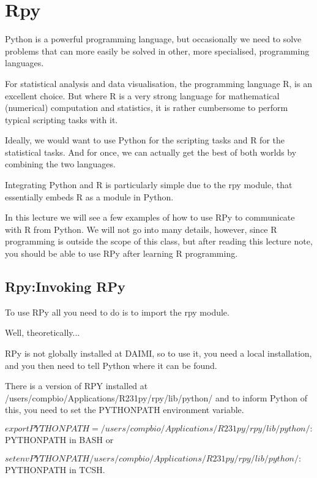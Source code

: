 \section{Rpy}

Python is a powerful programming language, but occasionally we need to solve problems that can more easily be solved in other, more specialised, programming languages.

For statistical analysis and data visualisation, the programming language R, is an excellent choice. But where R is a very strong language for mathematical (numerical) computation and statistics, it is rather cumbersome to perform typical scripting tasks with it.

Ideally, we would want to use Python for the scripting tasks and R for the statistical tasks. And for once, we can actually get the best of both worlds by combining the two languages.

Integrating Python and R is particularly simple due to the rpy module, that essentially embeds R as a module in Python.

In this lecture we will see a few examples of how to use RPy to communicate with R from Python. We will not go into many details, however, since R programming is outside the scope of this class, but after reading this lecture note, you should be able to use RPy after learning R programming.


\subsection{Rpy:Invoking RPy}

To use RPy all you need to do is to import the rpy module.

Well, theoretically...

RPy is not globally installed at DAIMI, so to use it, you need a local installation, and you then need to tell Python where it can be found.

There is a version of RPY installed at /users/compbio/Applications/R231py/rpy/lib/python/ and to inform Python of this, you need to set the PYTHONPATH environment variable.

$ export PYTHONPATH=/users/compbio/Applications/R231py/rpy/lib/python/:$PYTHONPATH
in BASH or

$ setenv PYTHONPATH /users/compbio/Applications/R231py/rpy/lib/python/:$PYTHONPATH
in TCSH.

